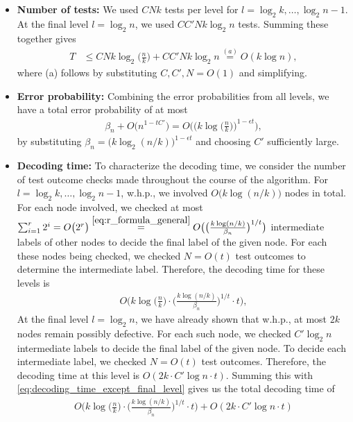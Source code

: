 \begin{itemize}
    \item \textbf{Number of tests:} We used $CNk$ tests per level for $l=\log_2k,\dots,\log_2n-1$. At the final level $l=\log_2n$, we used $CC'Nk\log_2n$ tests. Summing these together gives
    \begin{align}
        T&\leq CNk\log_2\Big(\frac{n}{k}\Big)+CC'Nk\log_2n\stackrel{(a)}{=}O(k\log n), \label{eq:final_test_num}
    \end{align}
    where (a) follows by substituting $C,C',N=O(1)$ and simplifying.
    \item \textbf{Error probability:} Combining the error probabilities from all levels, we have a total error probability of at most
    \begin{align}
        \beta_n+O\big(n^{1-tC'}\big)=O\bigg(\Big(k\log\Big(\frac{n}{k}\Big)\Big)^{1-\epsilon t}\bigg),
    \end{align}
    by substituting $\beta_n=\big(k\log_2(n/k)\big)^{1-\epsilon t}$ and choosing $C'$ sufficiently large.
    \item \textbf{Decoding time:} To characterize the decoding time, we consider the number of test outcome checks made throughout the course of the algorithm. For $l=\log_2k,\dots,\log_2n-1$, w.h.p., we involved $O\big(k\log(n/k)\big)$ nodes in total. For each node involved, we checked at most $\sum_{i=1}^r2^{i}=O\big(2^r\big) \stackrel{\eqref{eq:r_formula_general}}{=} O\big(\big(\frac{k\log(n/k)}{\beta_n}\big)^{1/t}\big)$ intermediate labels of other nodes to decide the final label of the given node. For each these nodes being checked, we checked $N=O(t)$ test outcomes to determine the intermediate label. Therefore, the decoding time for these levels is
    \begin{align}
        O\bigg(k\log\Big(\frac{n}{k}\Big)\cdot\Big(\frac{k\log(n/k)}{\beta_n}\Big)^{1/t}\cdot t\bigg), \label{eq:decoding_time_except_final_level}
    \end{align}
    At the final level $l=\log_2n$, we have already shown that w.h.p., at most $2k$ nodes remain possibly defective. For each such node, we checked $C'\log_2n$ intermediate labels to decide the final label of the given node. To decide each intermediate label, we checked $N=O(t)$ test outcomes. Therefore, the decoding time at this level is $O(2k\cdot C'\log n\cdot t)$. Summing this with \eqref{eq:decoding_time_except_final_level} gives us the total decoding time of 
    \begin{align}
        O\bigg(k\log\Big(\frac{n}{k}\Big)\cdot\Big(\frac{k\log(n/k)}{\beta_n}\Big)^{1/t}\cdot t\bigg)+O(2k\cdot C'\log n\cdot t)

\end{align}
\end{itemize}
